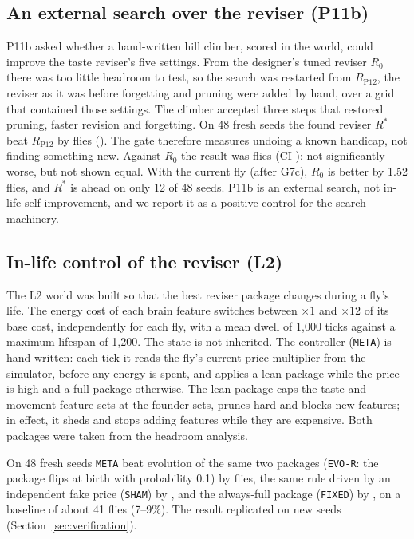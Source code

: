 \documentclass[11pt]{article}
\begin{document}
\subsection{An external search over the reviser (P11b)}

P11b asked whether a hand-written hill climber, scored in the world, could improve the taste reviser's five settings. From the designer's tuned reviser $R_0$ there was too little headroom to test, so the search was restarted from $R_{\mathrm{P12}}$, the reviser as it was before forgetting and pruning were added by hand, over a grid that contained those settings. The climber accepted three steps that restored pruning, faster revision and forgetting. On 48 fresh seeds the found reviser $R^*$ beat $R_{\mathrm{P12}}$ by \PelevenBMean{} flies (\PelevenBWins). The gate therefore measures undoing a known handicap, not finding something new. Against $R_0$ the result was \PelevenBvsRzeroMean{} flies (CI \PelevenBvsRzeroCI): not significantly worse, but not shown equal. With the current fly (after G7c), $R_0$ is better by 1.52 flies, and $R^*$ is ahead on only 12 of 48 seeds. P11b is an external search, not in-life self-improvement, and we report it as a positive control for the search machinery.

\subsection{In-life control of the reviser (L2)}

The L2 world was built so that the best reviser package changes during a fly's life. The energy cost of each brain feature switches between $\times 1$ and $\times 12$ of its base cost, independently for each fly, with a mean dwell of 1,000 ticks against a maximum lifespan of 1,200. The state is not inherited. The controller (\texttt{META}) is hand-written: each tick it reads the fly's current price multiplier from the simulator, before any energy is spent, and applies a lean package while the price is high and a full package otherwise. The lean package caps the taste and movement feature sets at the founder sets, prunes hard and blocks new features; in effect, it sheds and stops adding features while they are expensive. Both packages were taken from the headroom analysis.

On 48 fresh seeds \texttt{META} beat evolution of the same two packages (\texttt{EVO-R}: the package flips at birth with probability 0.1) by \LtwoEvorMean{} flies, the same rule driven by an independent fake price (\texttt{SHAM}) by \LtwoShamMean, and the always-full package (\texttt{FIXED}) by \LtwoFixedMean, on a baseline of about 41 flies (7--9\%). The result replicated on new seeds (Section~\ref{sec:verification}).
\end{document}
